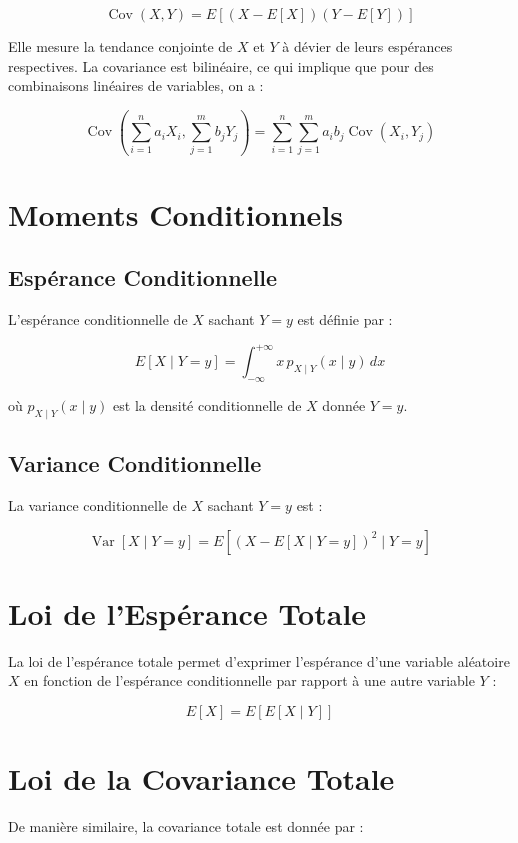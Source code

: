 \documentclass{article}
\begin{document}
\[
\operatorname{Cov}(X, Y) = E\left[ (X - E[X])(Y - E[Y]) \right]
\]

Elle mesure la tendance conjointe de $X$ et $Y$ à dévier de leurs espérances respectives. La covariance est bilinéaire, ce qui implique que pour des combinaisons linéaires de variables, on a :

\[
\operatorname{Cov}\left( \sum_{i=1}^n a_i X_i, \sum_{j=1}^m b_j Y_j \right) = \sum_{i=1}^n \sum_{j=1}^m a_i b_j \operatorname{Cov}(X_i, Y_j)
\]

\section{Moments Conditionnels}

\subsection{Espérance Conditionnelle}

L'espérance conditionnelle de $X$ sachant $Y = y$ est définie par :

\[
E[X \mid Y = y] = \int_{-\infty}^{+\infty} x \, p_{X \mid Y}(x \mid y) \, dx
\]

où $p_{X \mid Y}(x \mid y)$ est la densité conditionnelle de $X$ donnée $Y = y$.

\subsection{Variance Conditionnelle}

La variance conditionnelle de $X$ sachant $Y = y$ est :

\[
\operatorname{Var}[X \mid Y = y] = E\left[ (X - E[X \mid Y = y])^2 \mid Y = y \right]
\]

\section{Loi de l'Espérance Totale}

La loi de l'espérance totale permet d'exprimer l'espérance d'une variable aléatoire $X$ en fonction de l'espérance conditionnelle par rapport à une autre variable $Y$ :

\[
E[X] = E[E[X \mid Y]]
\]

\section{Loi de la Covariance Totale}

De manière similaire, la covariance totale est donnée par :
\end{document}
